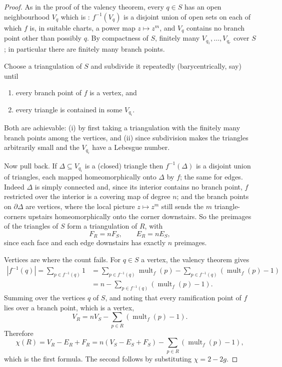 \documentclass[a4paper]{scrartcl}
\newcommand{\mult}{\operatorname{mult}}
\begin{document}
\begin{proof}
	As in the proof of the valency theorem, every $q \in S$ has an open neighbourhood $V_q$
	which is : $f^{-1}(V_q)$ is a disjoint union of open sets on each of
	which $f$ is, in suitable charts, a power map $z \mapsto z^m$, and $V_q$ contains no
	branch point other than possibly $q$. By compactness of $S$, finitely many
	$V_{q_1},\dots,V_{q_r}$ cover $S$; in particular there are finitely many branch points.

	Choose a triangulation of $S$ and subdivide it repeatedly (barycentrically, say) until
	\begin{enumerate}[label=(\roman*)]
		\item every branch point of $f$ is a vertex, and
		\item every triangle is contained in some $V_{q_i}$.
	\end{enumerate}
	Both are achievable: (i) by first taking a triangulation with the finitely many branch
	points among the vertices, and (ii) since subdivision makes the triangles arbitrarily
	small and the $V_{q_i}$ have a Lebesgue number.

	Now pull back. If $\Delta \subseteq V_{q_i}$ is a (closed) triangle then
	$f^{-1}(\Delta)$ is a disjoint union of triangles, each mapped homeomorphically onto
	$\Delta$ by $f$; the same for edges. Indeed $\Delta$ is simply connected and, since its
	interior contains no branch point, $f$ restricted over the interior is a covering map of
	degree $n$; and the branch points on $\partial \Delta$ are vertices, where the local
	picture $z \mapsto z^m$ still sends the $m$ triangle-corners upstairs homeomorphically
	onto the corner downstairs. So the preimages of the triangles of $S$ form a
	triangulation of $R$, with
	$$
	F_R = n F_S, \qquad E_R = n E_S,
	$$
	since each face and each edge downstairs has exactly $n$ preimages.

	Vertices are where the count fails. For $q \in S$ a vertex, the valency theorem gives
	\begin{align*}
	\left|f^{-1}(q)\right| = \sum_{p \in f^{-1}(q)} 1
	&= \sum_{p\in f^{-1}(q)}\mult_f(p) - \sum_{p\in f^{-1}(q)}\left(\mult_f(p)-1\right)\\
	&= n - \sum_{p\in f^{-1}(q)}\left(\mult_f(p)-1\right).
	\end{align*}
	Summing over the vertices $q$ of $S$, and noting that every ramification point of $f$
	lies over a branch point, which is a vertex,
	$$
	V_R = nV_S - \sum_{p\in R}\left(\mult_f(p)-1\right).
	$$
	Therefore
	$$
	\chi(R) = V_R - E_R + F_R = n(V_S - E_S + F_S) - \sum_{p\in R}(\mult_f(p)-1),
	$$
	which is the first formula. The second follows by substituting $\chi = 2-2g$.
\end{proof}
\end{document}
